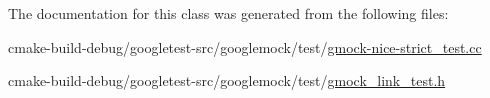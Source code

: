 The documentation for this class was generated from the following files\+:\begin{DoxyCompactItemize}
\item 
cmake-\/build-\/debug/googletest-\/src/googlemock/test/\mbox{\hyperlink{gmock-nice-strict__test_8cc}{gmock-\/nice-\/strict\+\_\+test.\+cc}}\item 
cmake-\/build-\/debug/googletest-\/src/googlemock/test/\mbox{\hyperlink{gmock__link__test_8h}{gmock\+\_\+link\+\_\+test.\+h}}\end{DoxyCompactItemize}
